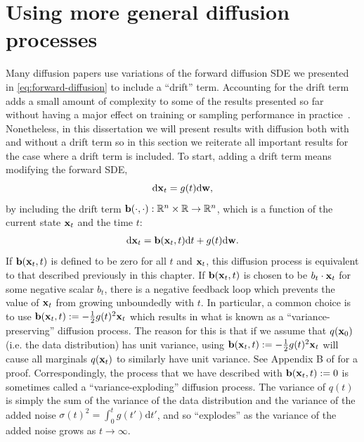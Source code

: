 \section{Using more general diffusion processes}
Many diffusion papers use variations of the forward diffusion SDE we presented in \cref{eq:forward-diffusion} to include a ``drift'' term. Accounting for the drift term adds a small amount of complexity to some of the results presented so far without having a major effect on training or sampling performance in practice~\citep{karras2022elucidating}. Nonetheless, in this dissertation we will present results with diffusion both with and without a drift term so in this section we reiterate all important results for the case where a drift term is included. To start, adding a drift term means modifying the forward SDE,
\begin{equation}
    \mathrm{d}{\mathbf{x}}_t = g(t) \mathrm{d}{\mathbf{w}},
\end{equation}
by including the drift term ${\mathbf{b}}(\cdot, \cdot): \mathbb{R}^n \times \mathbb{R} \rightarrow \mathbb{R}^n$, which is a function of the current state ${\mathbf{x}}_t$ and the time $t$:
\begin{align} \label{eq:forward-diffusion-with-drift}
    \mathrm{d}{\mathbf{x}}_t = {\mathbf{b}}({\mathbf{x}}_t, t) \mathrm{d}t + g(t) \mathrm{d}{\mathbf{w}}.
\end{align}
If ${\mathbf{b}}({\mathbf{x}}_t, t)$ is defined to be zero for all $t$ and ${\mathbf{x}}_t$, this diffusion process is equivalent to that described previously in this chapter. If ${\mathbf{b}}({\mathbf{x}}_t, t)$ is chosen to be $b_t \cdot {\mathbf{x}}_t$ for some negative scalar $b_t$, there is a negative feedback loop which prevents the value of ${\mathbf{x}}_t$ from growing unboundedly with $t$. In particular, a common choice is to use ${\mathbf{b}}({\mathbf{x}}_t, t) := - \frac{1}{2}g(t)^2{\mathbf{x}}_t$ which results in what is known as a ``variance-preserving'' diffusion process. The reason for this is that if we assume that $q({\mathbf{x}}_0)$ (i.e. the data distribution) has unit variance, using ${\mathbf{b}}({\mathbf{x}}_t, t) := - \frac{1}{2}g(t)^2{\mathbf{x}}_t$ will cause all marginals $q({\mathbf{x}}_t)$ to similarly have unit variance. See Appendix B of \citet{song2020score} for a proof. Correspondingly, the process that we have described with ${\mathbf{b}}({\mathbf{x}}_t, t) := 0$ is sometimes called a ``variance-exploding'' diffusion process. The variance of $q(t)$ is simply the sum of the variance of the data distribution and the variance of the added noise $\sigma(t)^2 = \int_0^t g(t') \mathrm{d}t'$, and so ``explodes'' as the variance of the added noise grows as $t \rightarrow \infty$.

